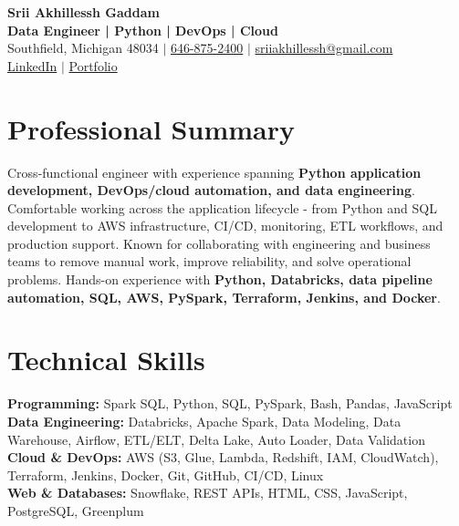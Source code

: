 \documentclass[letterpaper,10pt]{article}
\begin{document}
\fontsize{9.35pt}{10.45pt}\selectfont

\begin{center}
    {\LARGE \textbf{Srii Akhillessh Gaddam}} \\[-1pt]
    \textbf{Data Engineer | Python | DevOps | Cloud} \\[2pt]
    Southfield, Michigan 48034 $|$
    \href{tel:6468752400}{646-875-2400} $|$
    \href{mailto:sriiakhillessh@gmail.com}{sriiakhillessh@gmail.com} \\[1pt]
    \href{https://www.linkedin.com/in/srii-akhiilessh-gaddam-b48668191/}{LinkedIn} $|$
    \href{https://sriiakhillesshg.github.io/portfolio/}{Portfolio}
\end{center}
\vspace{-8pt}

\section{Professional Summary}
\small{Cross-functional engineer with experience spanning \textbf{Python application development, DevOps/cloud automation, and data engineering}. Comfortable working across the application lifecycle - from Python and SQL development to AWS infrastructure, CI/CD, monitoring, ETL workflows, and production support. Known for collaborating with engineering and business teams to remove manual work, improve reliability, and solve operational problems. Hands-on experience with \textbf{Python, Databricks, data pipeline automation, SQL, AWS, PySpark, Terraform, Jenkins, and Docker}.}

\section{Technical Skills}
\small{
\textbf{Programming:} Spark SQL, Python, SQL, PySpark, Bash, Pandas, JavaScript \\
\textbf{Data Engineering:} Databricks, Apache Spark, Data Modeling, Data Warehouse, Airflow, ETL/ELT, Delta Lake, Auto Loader, Data Validation \\
\textbf{Cloud \& DevOps:} AWS (S3, Glue, Lambda, Redshift, IAM, CloudWatch), Terraform, Jenkins, Docker, Git, GitHub, CI/CD, Linux \\
\textbf{Web \& Databases:} Snowflake, REST APIs, HTML, CSS, JavaScript, PostgreSQL, Greenplum
}
\end{document}
